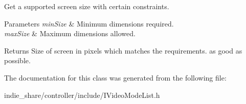 Get a supported screen size with certain constraints. 


\begin{DoxyParams}{Parameters}
{\em min\+Size} & Minimum dimensions required. \\
\hline
{\em max\+Size} & Maximum dimensions allowed. \\
\hline
\end{DoxyParams}
\begin{DoxyReturn}{Returns}
Size of screen in pixels which matches the requirements. as good as possible. 
\end{DoxyReturn}


The documentation for this class was generated from the following file\+:\begin{DoxyCompactItemize}
\item 
indie\+\_\+share/controller/include/I\+Video\+Mode\+List.\+h\end{DoxyCompactItemize}
